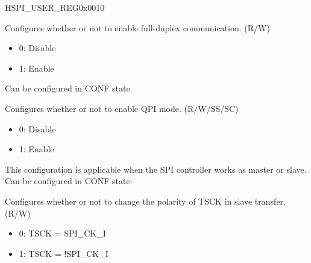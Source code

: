 \begin{register}{H}{SPI\_USER\_REG}{0x0010}\label{regdesc:SPIUSERREG}
%
%
%
%
%
%
%
%
%
%
%
%
%
%
%
%
%
%
%
%
%
%
%
%
%
\regnewline%
\begin{regdesc}\begin{reglist}
\label{fielddesc:SPIDOUTDIN}\item [SPI\_DOUTDIN] Configures whether or not to enable full-duplex communication. (R/W)\\
\begin{itemize}
    \item 0: Disable
    \item 1: Enable
\end{itemize}
Can be configured in CONF state. 
\label{fielddesc:SPIQPIMODE}\item [SPI\_QPI\_MODE] Configures whether or not to enable QPI mode. (R/W/SS/SC)\\
\begin{itemize}
    \item 0: Disable
    \item 1: Enable
\end{itemize}
This configuration is applicable when the SPI controller works as master or slave. Can be configured in CONF state. 
\label{fielddesc:SPITSCKIEDGE}\item [SPI\_TSCK\_I\_EDGE] Configures whether or not to change the polarity of TSCK in slave transfer. (R/W)
\begin{itemize}
    \item 0: TSCK = SPI\_CK\_I
    \item 1: TSCK = !SPI\_CK\_I

\end{itemize}
\end{reglist}
\end{regdesc}
\end{register}

